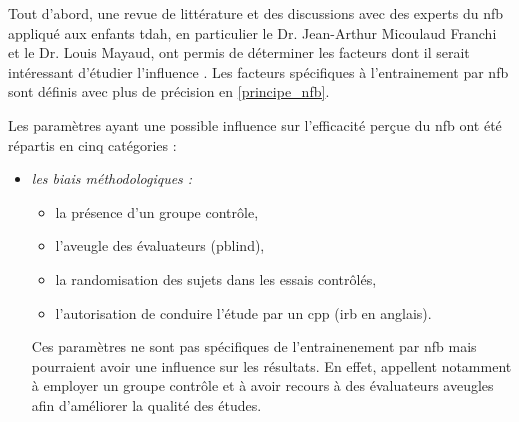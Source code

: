 Tout d'abord, une revue de littérature et des discussions avec des experts du \gls{nfb} appliqué aux enfants \gls{tdah}, en particulier le Dr. Jean-Arthur Micoulaud Franchi
et le Dr. Louis Mayaud, ont permis de déterminer les facteurs dont il serait intéressant d'étudier l'influence \citep{Vernon2004, Arns2009, Arns2014, 
Cortese2016, Enriquez2017, Strehl2014}. Les facteurs 
spécifiques à l'entrainement par \gls{nfb} sont définis avec plus de précision en \ref{principe_nfb}.

Les paramètres ayant une possible influence sur l'efficacité perçue du \gls{nfb} ont été répartis en cinq catégories :
\renewcommand{\labelitemi}{$\bullet$}
\begin{itemize}
\item \emph{les biais méthodologiques :} 
    \begin{itemize} 
		\item la présence d'un groupe contrôle, 
		\item l'aveugle des évaluateurs (\gls{pblind}), 
		\item la randomisation des sujets dans les essais contrôlés,
		\item l'autorisation de conduire l'étude par un \gls{cpp} (\gls{irb} en anglais).
    \end{itemize}
Ces paramètres ne sont pas spécifiques de l'entrainenement par \gls{nfb} mais pourraient avoir une influence sur les résultats.
En effet, \citet{Ros2019} appellent notamment à employer un groupe contrôle et à avoir recours à des évaluateurs aveugles afin d'améliorer la qualité des études.


\end{itemize}
